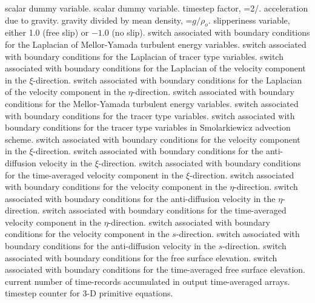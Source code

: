 \begin{klist}
\begin{klist}
        scalar dummy variable.
        scalar dummy variable.
        timestep factor, =2/.
             acceleration due to gravity.
        gravity divided by mean density,
    =$g/\rho_o$.
        slipperiness variable, either 1.0 (free slip) or
    $-1.0$ (no slip).
       switch associated with boundary conditions for the
    Laplacian of Mellor-Yamada turbulent energy variables.
       switch associated with boundary conditions for the
    Laplacian of tracer type variables.
       switch associated with boundary conditions for the
    Laplacian of the velocity component in the $\xi$-direction.
       switch associated with boundary conditions for the
    Laplacian of the velocity component in the $\eta$-direction.
          switch associated with boundary conditions for the
    Mellor-Yamada turbulent energy variables.
          switch associated with boundary conditions for the
    tracer type variables.
         switch associated with boundary conditions for the
    tracer type variables in Smolarkiewicz advection scheme.
          switch associated with boundary conditions for the
    velocity component in the $\xi$-direction.
         switch associated with boundary conditions for the
    anti-diffusion velocity in the $\xi$-direction.
       switch associated with boundary conditions for the
    time-averaged velocity component in the $\xi$-direction.
          switch associated with boundary conditions for the
    velocity component in the $\eta$-direction.
         switch associated with boundary conditions for the
    anti-diffusion velocity in the $\eta$-direction.
       switch associated with boundary conditions for the
    time-averaged velocity component in the $\eta$-direction.
          switch associated with boundary conditions for the
    velocity component in the $s$-direction.
         switch associated with boundary conditions for the
    anti-diffusion velocity in the $s$-direction.
          switch associated with boundary conditions for the
    free surface elevation.
       switch associated with boundary conditions for the
    time-averaged free surface elevation.
         current number of time-records accumulated in
    output time-averaged arrays.
           timestep counter for 3-D primitive equations.

\end{klist}
\end{klist}
